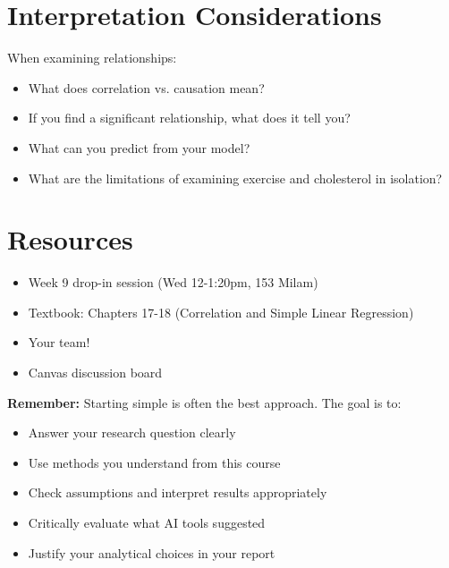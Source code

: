 \documentclass[11pt]{article}
\begin{document}
\section*{Interpretation Considerations}

When examining relationships:
\begin{itemize}
\item What does correlation vs. causation mean?
\item If you find a significant relationship, what does it tell you?
\item What can you predict from your model?
\item What are the limitations of examining exercise and cholesterol in isolation?
\end{itemize}

\section*{Resources}

\begin{itemize}
\item Week 9 drop-in session (Wed 12-1:20pm, 153 Milam)
\item Textbook: Chapters 17-18 (Correlation and Simple Linear Regression)
\item Your team!
\item Canvas discussion board
\end{itemize}

\vspace{0.5cm}

\begin{tcolorbox}[colback=gray!10,colframe=gray!50,boxrule=1pt,arc=2pt]
\textbf{Remember:} Starting simple is often the best approach. The goal is to:
\begin{itemize}
\item Answer your research question clearly
\item Use methods you understand from this course
\item Check assumptions and interpret results appropriately
\item Critically evaluate what AI tools suggested
\item Justify your analytical choices in your report
\end{itemize}
\end{tcolorbox}
\end{document}
